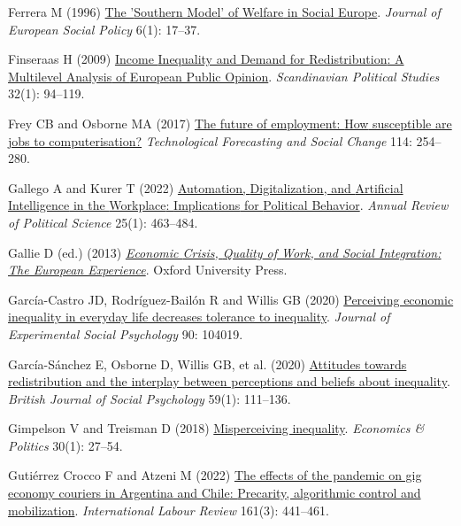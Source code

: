 \documentclass[
  12pt,
]{article}
\newlength{\cslhangindent}
\newenvironment{CSLReferences}[2] %
 {\begin{list}{}{%
  \setlength{\itemindent}{0pt}
  \setlength{\leftmargin}{0pt}
  \setlength{\parsep}{0pt}
  \ifodd #1
   \setlength{\leftmargin}{\cslhangindent}
   \setlength{\itemindent}{-1\cslhangindent}
  \fi
  \setlength{\itemsep}{#2\baselineskip}}}
 {\end{list}}
\begin{document}
\begin{CSLReferences}{1}{1}
Ferrera M (1996) \href{https://doi.org/10.1177/095892879600600102}{The
'{Southern Model}' of {Welfare} in {Social Europe}}. \emph{Journal of
European Social Policy} 6(1): 17--37.

Finseraas H (2009)
\href{https://doi.org/10.1111/j.1467-9477.2008.00211.x}{Income
{Inequality} and {Demand} for {Redistribution}: {A Multilevel Analysis}
of {European Public Opinion}}. \emph{Scandinavian Political Studies}
32(1): 94--119.

Frey CB and Osborne MA (2017)
\href{https://doi.org/10.1016/j.techfore.2016.08.019}{The future of
employment: {How} susceptible are jobs to computerisation?}
\emph{Technological Forecasting and Social Change} 114: 254--280.

Gallego A and Kurer T (2022)
\href{https://doi.org/10.1146/annurev-polisci-051120-104535}{Automation,
{Digitalization}, and {Artificial Intelligence} in the {Workplace}:
{Implications} for {Political Behavior}}. \emph{Annual Review of
Political Science} 25(1): 463--484.

Gallie D (ed.) (2013)
\emph{\href{https://doi.org/10.1093/acprof:oso/9780199664719.001.0001}{Economic
{Crisis}, {Quality} of {Work}, and {Social Integration}: {The European
Experience}}}. Oxford University Press.

García-Castro JD, Rodríguez-Bailón R and Willis GB (2020)
\href{https://doi.org/10.1016/j.jesp.2020.104019}{Perceiving economic
inequality in everyday life decreases tolerance to inequality}.
\emph{Journal of Experimental Social Psychology} 90: 104019.

García-Sánchez E, Osborne D, Willis GB, et al. (2020)
\href{https://doi.org/10.1111/bjso.12326}{Attitudes towards
redistribution and the interplay between perceptions and beliefs about
inequality}. \emph{British Journal of Social Psychology} 59(1):
111--136.

Gimpelson V and Treisman D (2018)
\href{https://doi.org/10.1111/ecpo.12103}{Misperceiving inequality}.
\emph{Economics \& Politics} 30(1): 27--54.

Gutiérrez Crocco F and Atzeni M (2022)
\href{https://doi.org/10.1111/ilr.12376}{The effects of the pandemic on
gig economy couriers in {Argentina} and {Chile}: {Precarity},
algorithmic control and mobilization}. \emph{International Labour
Review} 161(3): 441--461.


\end{CSLReferences}
\end{document}
